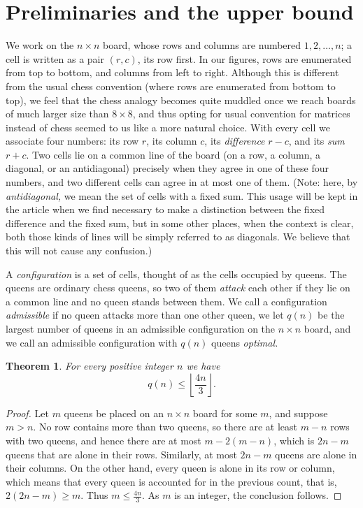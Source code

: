 \documentclass[10pt,a4paper]{article}
\newtheorem{theorem}{Theorem}[section]
\theoremstyle{definition}
\begin{document}
\section{Preliminaries and the upper bound}
\label{s2}

We work on the $n\times n$ board, whose rows and columns are numbered
$1,2,\dots,n$; a cell is written as a pair $(r,c)$, its row first. In our figures, rows are enumerated from top to bottom, and columns from left to right. Although this is different from the usual chess convention (where rows are enumerated from bottom to top), we feel that the chess analogy becomes quite muddled once we reach boards of much larger size than $8\times 8$, and thus opting for usual convention for matrices instead of chess seemed to us like a more natural choice. With every
cell we associate four numbers: its row $r$, its column $c$, its
\emph{difference} $r-c$, and its \emph{sum} $r+c$. Two cells lie on a common
line of the board (on a row, a column, a diagonal, or an antidiagonal)
precisely when they agree in one of these four numbers, and two different cells
can agree in at most one of them. (Note: here, by \emph{antidiagonal,} we mean the set of cells with a fixed sum. This usage will be kept in the article when we find necessary to make a distinction between the fixed difference and the fixed sum, but in some other places, when the context is clear, both those kinds of lines will be simply referred to as diagonals. We believe that this will not cause any confusion.)

A \emph{configuration} is a set of cells, thought of as the cells occupied by
queens. The queens are ordinary chess queens, so two of them \emph{attack} each
other if they lie on a common line and no queen stands between them. We call a
configuration \emph{admissible} if no queen attacks more than one other queen,
we let $q(n)$ be the largest number of queens in an admissible configuration on
the $n\times n$ board, and we call an admissible configuration with $q(n)$
queens \emph{optimal.}

\begin{theorem}
\label{upper}
For every positive integer $n$ we have
\[
q(n)\leqslant\left\lfloor\frac{4n}{3}\right\rfloor.
\]
\end{theorem}

\begin{proof}
Let $m$ queens be placed on an $n\times n$ board for some $m$, and suppose $m>n$. No row contains
more than two queens, so there are at least $m - n$ rows with two queens, and hence there are
at most $m - 2(m - n)$, which is $ 2n - m $ queens that are alone in their rows. Similarly, at most $2n - m$
queens are alone in their columns. On the other hand, every queen is alone in its
row or column, which means that every queen is accounted for in the previous count, that is,
$  2(2n - m)\geqslant m$. Thus $m \leqslant \frac{ 4n}
3 $. As $m$ is an integer, the  conclusion follows.\end{proof}
\end{document}

